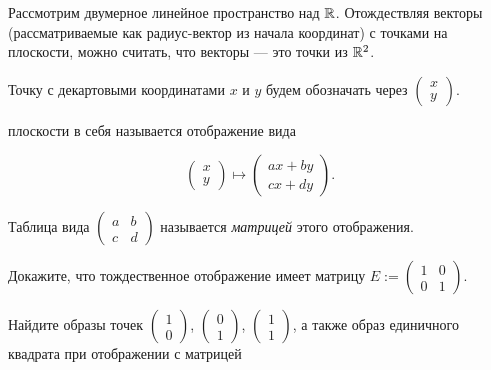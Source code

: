 \documentclass[a4paper,12pt]{article}
\begin{document}
	
	Рассмотрим двумерное линейное пространство над $\mathbb{R}$. Отождествляя векторы (рассматриваемые как радиус-вектор из начала координат) с точками на плоскости, можно считать, что векторы --- это точки из  $\mathbb{R}^2$.
	
	Точку с декартовыми координатами $x$ и $y$ будем обозначать через $\begin{pmatrix} x \\ y \end{pmatrix}$.

 плоскости в себя называется отображение вида 

$$\begin{pmatrix} x \\ y \end{pmatrix} \mapsto \begin{pmatrix} ax+by \\ cx+dy \end{pmatrix}.$$

Таблица вида $\begin{pmatrix} a & b  \\ c & d \end{pmatrix}$ называется {\it матрицей} этого отображения. 

 Докажите, что тождественное отображение имеет матрицу $E :=  \begin{pmatrix} 1 & 0  \\ 0 & 1 \end{pmatrix}.$

 Найдите образы точек $\begin{pmatrix} 1 \\ 0 \end{pmatrix}$, $\begin{pmatrix} 0 \\ 1 \end{pmatrix}$, $\begin{pmatrix} 1 \\ 1 \end{pmatrix}$, а также образ единичного квадрата при отображении с матрицей
\end{document}
